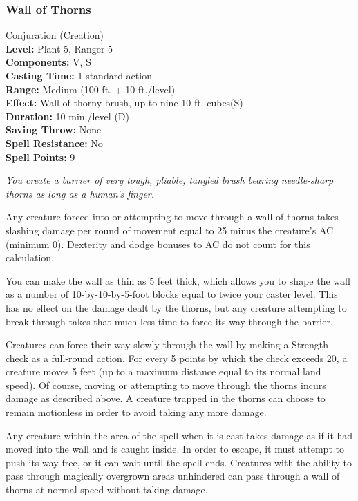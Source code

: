 \subsubsection{Wall of Thorns}
\label{Spell:WallOfThorns}
Conjuration (Creation)
\\ \textbf{Level:} Plant 5, Ranger 5
\\ \textbf{Components:} V, S
\\ \textbf{Casting Time:} 1 standard action
\\ \textbf{Range:} Medium (100 ft. + 10 ft./level)
\\ \textbf{Effect:} Wall of thorny brush, up to nine 10-ft. cubes(S)
\\ \textbf{Duration:} 10 min./level (D)
\\ \textbf{Saving Throw:} None
\\ \textbf{Spell Resistance:} No
\\ \textbf{Spell Points:} 9

\emph{You create a barrier of very tough, pliable, tangled brush bearing needle-sharp thorns as long as a human's finger.}

Any creature forced into or attempting to move through a wall of thorns takes slashing damage per round of movement equal to 25 minus the creature's AC (minimum 0). Dexterity and dodge bonuses to AC do not count for this calculation.

You can make the wall as thin as 5 feet thick, which allows you to shape the wall as a number of 10-by-10-by-5-foot blocks equal to twice your caster level. This has no effect on the damage dealt by the thorns, but any creature attempting to break through takes that much less time to force its way through the barrier.

Creatures can force their way slowly through the wall by making a Strength check as a full-round action. For every 5 points by which the check exceeds 20, a creature moves 5 feet (up to a maximum distance equal to its normal land speed). Of course, moving or attempting to move through the thorns incurs damage as described above. A creature trapped in the thorns can choose to remain motionless in order to avoid taking any more damage.

Any creature within the area of the spell when it is cast takes damage as if it had moved into the wall and is caught inside. In order to escape, it must attempt to push its way free, or it can wait until the spell ends. Creatures with the ability to pass through magically overgrown areas unhindered can pass through a wall of thorns at normal speed without taking damage.

